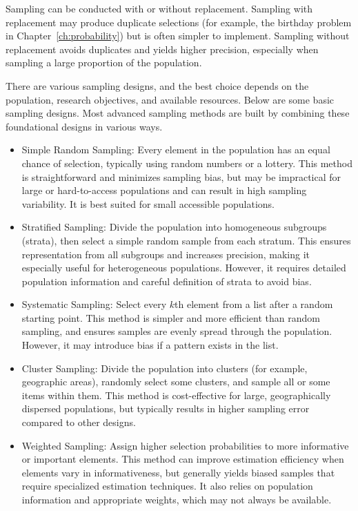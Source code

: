 Sampling can be conducted with or without replacement. Sampling with replacement
may produce duplicate selections (for example, the birthday problem in
Chapter~\ref{ch:probability}) but is often simpler to implement. Sampling
without replacement avoids duplicates and yields higher precision, especially
when sampling a large proportion of the population.

There are various sampling designs, and the best choice depends on the
population, research objectives, and available resources. Below are some basic
sampling designs. Most advanced sampling methods are built by combining these
foundational designs in various ways.
\begin{itemize}
  
\item Simple Random Sampling: Every element in the population has an equal
  chance of selection, typically using random numbers or a lottery. This method
  is straightforward and minimizes sampling bias, but may be impractical for
  large or hard-to-access populations and can result in high sampling
  variability. It is best suited for small accessible populations.

\item Stratified Sampling: Divide the population into homogeneous subgroups
  (strata), then select a simple random sample from each stratum. This ensures
  representation from all subgroups and increases precision, making it
  especially useful for heterogeneous populations. However, it requires detailed
  population information and careful definition of strata to avoid bias.

\item Systematic Sampling: Select every \(k\)th element from a list after a
  random starting point. This method is simpler and more efficient than random
  sampling, and ensures samples are evenly spread through the
  population. However, it may introduce bias if a pattern exists in the list.

\item Cluster Sampling: Divide the population into clusters (for example, geographic
  areas), randomly select some clusters, and sample all or some items within
  them. This method is cost-effective for large, geographically dispersed
  populations, but typically results in higher sampling error compared to other
  designs.

\item Weighted Sampling: Assign higher selection probabilities to more
  informative or important elements. This method can improve estimation
  efficiency when elements vary in informativeness, but generally yields biased
  samples that require specialized estimation techniques. It also relies on
  population information and appropriate weights, which may not always be
  available.
\end{itemize}

